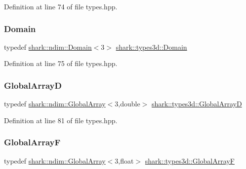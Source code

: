 Definition at line 74 of file types.\+hpp.

\hypertarget{namespaceshark_1_1types3d_a112a0578e6b907e595ac18e1f5c97661}{}\label{namespaceshark_1_1types3d_a112a0578e6b907e595ac18e1f5c97661} 
\subsubsection{\texorpdfstring{Domain}{Domain}}
{\footnotesize\ttfamily typedef \hyperlink{classshark_1_1ndim_1_1_domain}{shark\+::ndim\+::\+Domain}$<$3$>$ \hyperlink{namespaceshark_1_1types3d_a112a0578e6b907e595ac18e1f5c97661}{shark\+::types3d\+::\+Domain}}



Definition at line 75 of file types.\+hpp.

\hypertarget{namespaceshark_1_1types3d_adec078931cbcd64a77c14b21c5d631d0}{}\label{namespaceshark_1_1types3d_adec078931cbcd64a77c14b21c5d631d0} 
\subsubsection{\texorpdfstring{Global\+ArrayD}{GlobalArrayD}}
{\footnotesize\ttfamily typedef \hyperlink{classshark_1_1ndim_1_1_global_array}{shark\+::ndim\+::\+Global\+Array}$<$3,double$>$ \hyperlink{namespaceshark_1_1types3d_adec078931cbcd64a77c14b21c5d631d0}{shark\+::types3d\+::\+Global\+ArrayD}}



Definition at line 81 of file types.\+hpp.

\hypertarget{namespaceshark_1_1types3d_aa7b35ad09a98a11a86cd9aa4097a7f42}{}\label{namespaceshark_1_1types3d_aa7b35ad09a98a11a86cd9aa4097a7f42} 
\subsubsection{\texorpdfstring{Global\+ArrayF}{GlobalArrayF}}
{\footnotesize\ttfamily typedef \hyperlink{classshark_1_1ndim_1_1_global_array}{shark\+::ndim\+::\+Global\+Array}$<$3,float$>$ \hyperlink{namespaceshark_1_1types3d_aa7b35ad09a98a11a86cd9aa4097a7f42}{shark\+::types3d\+::\+Global\+ArrayF}}



